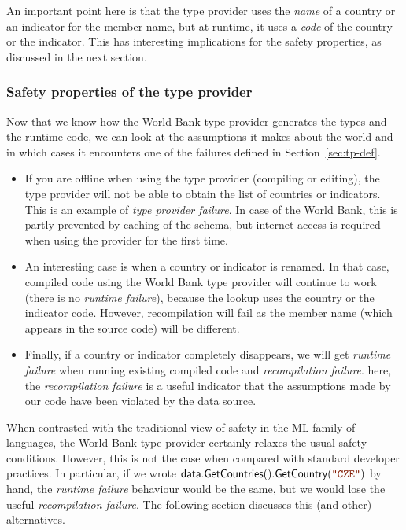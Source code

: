 \documentclass[submission,copyright,creativecommons]{eptcs}
\newcommand{\str}[1]{\textnormal{\textcolor{strclr}{\ttfamily "#1"}}}
\newcommand{\ident}[1]{\textnormal{\sffamily #1}}
\begin{document}
An important point here is that the type provider uses the \emph{name} of a country or an indicator
for the member name, but at runtime, it uses a \emph{code} of the country or the indicator. This has
interesting implications for the safety properties, as discussed in the next section.

\subsubsection{Safety properties of the type provider}

Now that we know how the World Bank type provider generates the types and the runtime code, we can
look at the assumptions it makes about the world and in which cases it encounters one of the failures
defined in Section~\ref{sec:tp-def}.

\begin{itemize}
\item If you are offline when using the type provider (compiling or editing), the type provider will
  not be able to obtain the list of countries or indicators. This is an example of \emph{type provider
  failure}. In case of the World Bank, this is partly prevented by caching of the schema, but internet
  access is required when using the provider for the first time.

\item An interesting case is when a country or indicator is renamed. In that case, compiled code
  using the World Bank type provider will continue to work (there is no \emph{runtime failure}),
  because the lookup uses the country or the indicator code. However, recompilation will fail
  as the member name (which appears in the source code) will be different.

\item Finally, if a country or indicator completely disappears, we will get \emph{runtime failure}
  when running existing compiled code and \emph{recompilation failure}. here, the \emph{recompilation
  failure} is a useful indicator that the assumptions made by our code have been violated by
  the data source.
\end{itemize}

\noindent
When contrasted with the traditional view of safety in the ML family of languages, the World Bank
type provider certainly relaxes the usual safety conditions. However, this is not the case when
compared with standard developer practices. In particular, if we wrote
$\ident{data.GetCountries}().\ident{GetCountry}(\str{CZE})$ by hand, the \emph{runtime failure}
behaviour would be the same, but we would lose the useful \emph{recompilation failure}. The following
section discusses this (and other) alternatives.
\end{document}
